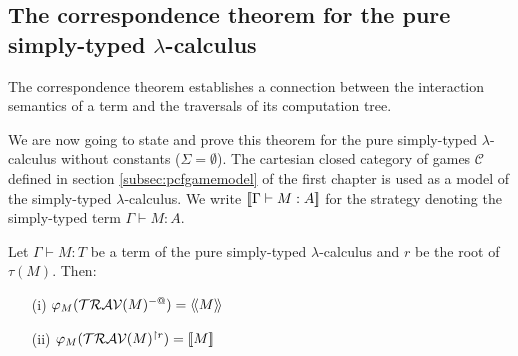\subsection{The correspondence theorem for the pure simply-typed $\lambda$-calculus}
The correspondence theorem establishes a connection between
the interaction semantics of a term and the traversals of its computation tree.

We are now going to state and prove this theorem for the pure simply-typed $\lambda$-calculus without constants ($\Sigma = \emptyset$).
The cartesian closed category of games $\mathcal{C}$ defined in section \ref{subsec:pcfgamemodel} of the first chapter is used as a
model of the simply-typed $\lambda$-calculus. We write ${[\![ \Gamma \vdash M : A ]\!]}$ for the strategy denoting the simply-typed term
$\Gamma \vdash M : A$.

\begin{prop}
\label{prop:rel_gamesem_trav} Let $\Gamma \vdash M : T$ be a
term of the pure simply-typed $\lambda$-calculus and $r$ be the root
of $\tau(M)$. Then:
\begin{itemize}
\item[(i)]  $\varphi_M(\mathcal{TRAV}(M)^{-@}) = {\langle\!\langle M \rangle\!\rangle}$
\item[(ii)] $\varphi_M(\mathcal{TRAV}(M)^{\upharpoonright r}) = {[\![ M ]\!]}$
\end{itemize}
\end{prop}


